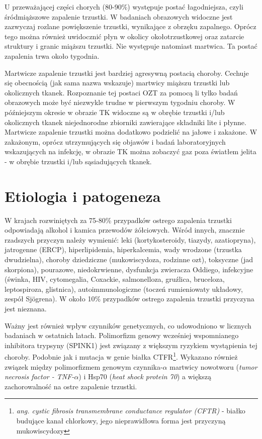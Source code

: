\documentclass[a4paper, 12pt]{report}
\begin{document}
U przeważającej części chorych (80-90\%) występuje postać łagodniejsza,
czyli śródmiąższowe zapalenie trzustki. W badaniach obrazowych
widoczne jest zazwyczaj rozlane powiększenie trzustki, wynikające z
obrzęku zapalnego. Oprócz tego można również uwidocznić płyn w okolicy
okołotrzustkowej oraz zatarcie struktury i granic miąższu
trzustki. Nie występuje natomiast martwica. Ta postać zapalenia trwa
około tygodnia.

Martwicze zapalenie trzustki jest bardziej agresywną postacią
choroby. Cechuje się obecnością (jak sama nazwa wskazuje) martwicy
miąższu trzustki lub okolicznych tkanek. Rozpoznanie tej postaci
OZT za pomocą li tylko badań obrazowych może być niezwykle trudne
w pierwszym tygodniu choroby. W późniejszym okresie w obrazie TK
widoczne są w obrębie trzustki i/lub okolicznych tkanek niejednorodne
zbiorniki zawierające składniki lite i płynne. Martwicze zapalenie trzustki można
dodatkowo podzielić na jałowe i zakażone. W zakażonym, oprócz
utrzymujących się objawów i badań laboratoryjnych wskazujących na
infekcję, w obrazie TK można zobaczyć gaz poza światłem jelita - w
obrębie trzustki i/lub sąsiadujących tkanek. 

\chapter{Etiologia i patogeneza}

W krajach rozwiniętych za 75-80\% przypadków ostrego zapalenia
trzustki odpowiadają alkohol i kamica przewodów żółciowych. Wśród
innych, znacznie rzadszych przyczyn należy wymienić: leki
(kortykosteroidy, tiazydy, azatiopryna), jatrogenne (ERCP),
hiperlipidemia, hiperkalcemia, wady wrodzone (trzustka dwudzielna),
choroby dziedziczne (mukowiscydoza, rodzinne ozt), toksyczne (jad
skorpiona), pourazowe, niedokrwienne, dysfunkcja zwieracza Oddiego,
infekcyjne (świnka, HIV, cytomegalia, Coxackie, salmonelloza,
gruźlica, bruceloza, leptospiroza, glistnica), autoimmunologiczne
(toczeń rumieniowaty układowy, zespół Sjögrena). W około 10\% przypadków
ostrego zapalenia trzustki przyczyna jest nieznana. 

Ważny jest również wpływ czynników genetycznych, co udowodniono w
licznych badaniach w ostatnich latach.
Polimorfizm genowy wcześniej wspomnianego inhibitora trypsyny (SPINK1)
jest związany z większym ryzykiem wystąpienia tej choroby.\cite{38}
Podobnie jak i mutacja w genie białka
CTFR\footnote{\textsl{ang. cystic fibrosis transmembrane conductance 
regulator (CFTR)} - białko budujące kanał chlorkowy, jego
  nieprawidłowa forma jest przyczyną mukowiscydozy}.\cite{39}
Wykazano również związek między polimorfizmem genowym
czynnika-$\alpha$ martwicy nowotworu (\textsl{tumor necrosis factor -
TNF-$\alpha$}) i Hsp70 (\textsl{heat shock protein 70}) a większą
zachorowalność na ostre zapalenie trzustki.\cite{40}
\end{document}
